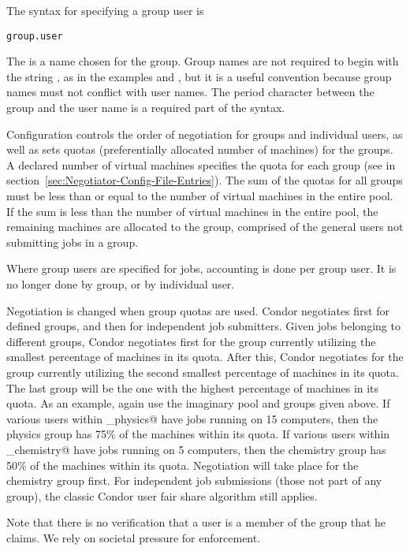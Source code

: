 The syntax for specifying a group user is
\begin{verbatim}
group.user
\end{verbatim}
The \verb@group@ is a name chosen for the group.
Group names are not required to begin with the
string ,
as in the examples
 and ,
but it is a useful convention because group names
must not conflict with user names.
The period character between the group and the user name is
a required part of the syntax.

Configuration controls the order of negotiation for
groups and individual users,
as well as sets quotas
(preferentially allocated number of machines)
for the groups.
A declared number of virtual machines specifies the quota for each group
(see 
in section~\ref{sec:Negotiator-Config-File-Entries}).
The sum of the quotas for all groups must be less than or equal to
the number of virtual machines in the entire pool.
If the sum is less than the number of
virtual machines in the entire pool,
the remaining machines are 
allocated to the \verb@none@ group,
comprised of the general
users not submitting jobs in a group.

Where group users are specified for jobs,
accounting is done per group user.
It is no longer done by group, or by individual user.

Negotiation is changed when group quotas are used.
Condor negotiates first for defined groups,
and then for independent job submitters.
Given jobs belonging to different groups,
Condor negotiates first for the group 
currently utilizing the smallest percentage of machines
in its quota.
After this,
Condor negotiates for the group 
currently utilizing the second smallest percentage of machines
in its quota.
The last group will be the one with the highest percentage
of machines in its quota.
As an example, again use the imaginary pool and groups 
given above.
If various users within \verb@group_physics@ have
jobs running on 15 computers, 
then the physics group has 75\% of the 
machines within its quota.
If various users within \verb@group_chemistry@ have
jobs running on 5 computers, 
then the chemistry group has 50\% of the 
machines within its quota.
Negotiation will take place for the chemistry group first.
For independent job submissions (those not part of any group),
the classic Condor user fair share algorithm still applies.

Note that there is no verification that a user is a member of
the group that he claims.
We rely on societal pressure for enforcement. 

